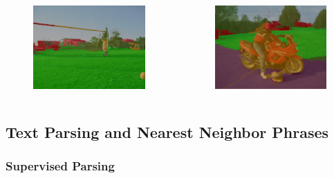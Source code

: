 \documentclass{beamer}
\begin{document}
\frame
{
  \begin{columns}
  \begin{figure}[ht]  
	  \begin{center}
		  \includegraphics[width=2.1in]{images/ex1_ext.png}   
	  \end{center}   
  \end{figure}
  \begin{figure}[ht]
	  \begin{center}
		  \includegraphics[width=2.1in]{images/ex1_ext2.png} 
	  \end{center}
  \end{figure}
  \end{columns}
}
\subsection{Text Parsing and Nearest Neighbor Phrases}
\frame
{
  \frametitle{Supervised Parsing}
}
\end{document}
